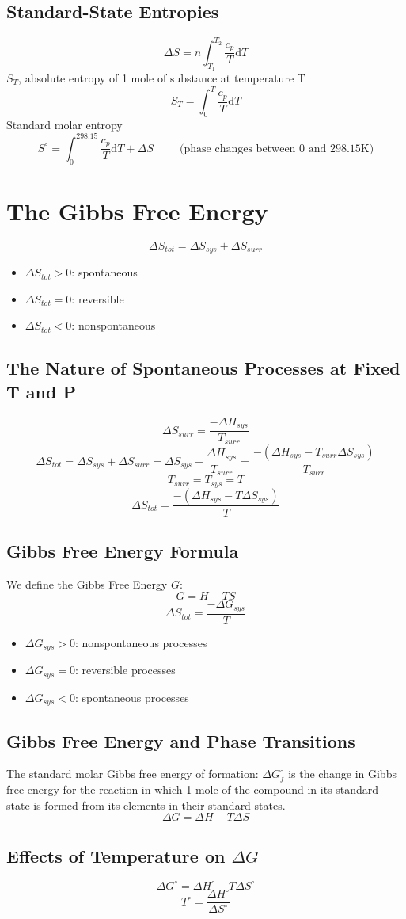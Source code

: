 \documentclass[10pt]{article}
\newcommand{\der}{\text{d}}
\begin{document}
\subsection*{Standard-State Entropies}
\[\Delta S = n \int_{T_1}^{T_2} \frac{c_p}{T}\der T\]
$S_T$, absolute entropy of 1 mole of substance at temperature T
\[S_T = \int_0^T \frac{c_p}{T}\der T\]
Standard molar entropy
\[S^\circ = \int_0^{298.15} \frac{c_p}{T}\der T + \Delta S \hspace{1cm}\text{(phase changes between 0 and 298.15K)}\]

\section*{The Gibbs Free Energy}
\[\Delta S_{tot} = \Delta S_{sys} + \Delta S_{surr}\]
\begin{itemize}
    \item $\Delta S_{tot} > 0$: spontaneous
    \item $\Delta S_{tot} = 0$: reversible
    \item $\Delta S_{tot} < 0$: nonspontaneous
\end{itemize}

\subsection*{The Nature of Spontaneous Processes at Fixed T and P}
\[\Delta S_{surr} = \frac{- \Delta H_{sys}}{T_{surr}}\]
\[\Delta S_{tot} = \Delta S_{sys} + \Delta S_{surr} = \Delta S_{sys} - \frac{\Delta H_{sys}}{T_{surr}} = \frac{-(\Delta H_{sys} - T_{surr}\Delta S_{sys})}{T_{surr}}\]
\[T_{surr} = T_{sys} = T\]
\[\Delta S_{tot} = \frac{-(\Delta H_{sys} - T\Delta S_{sys})}{T}\]

\subsection*{Gibbs Free Energy Formula}
We define the Gibbs Free Energy $G$:
\[G = H - TS\]
\[\Delta S_{tot} = \frac{-\Delta G_{sys}}{T}\]
\begin{itemize}
    \item $\Delta G_{sys} > 0$: nonspontaneous processes
    \item $\Delta G_{sys} = 0$: reversible processes
    \item $\Delta G_{sys} < 0$: spontaneous processes
\end{itemize}

\subsection*{Gibbs Free Energy and Phase Transitions}
The standard molar Gibbs free energy of formation: $\Delta G_f^\circ$ is the change in Gibbs free energy for the reaction in which 1 mole of the compound in its standard state is formed from its elements in their standard states.
\[\Delta G = \Delta H - T\Delta S\]

\subsection*{Effects of Temperature on $\Delta G$}
\[\Delta G^\circ = \Delta H^\circ - T \Delta S^\circ\]
\[T^\circ = \frac{\Delta H^\circ}{\Delta S^\circ}\]
\end{document}
